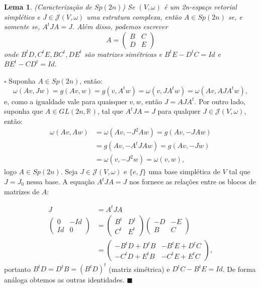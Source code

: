 \documentclass[12pt]{book}
\newtheorem{lema}[teorema]{Lema}
\newenvironment{prova}[1]{$\square$ #1}{\hfill$\blacksquare$}
\newcommand{\estruturacomplexa}{J_{0}}
\newcommand{\estruturascomplexaspadrao}{\mathcal{J}(V, \omega)}
\newcommand{\generalgroup}[2]{GL(#1, #2)}
\newcommand{\generalgroupreal}[1]{\generalgroup{#1}{\real{}}}
\newcommand{\gruposimpletico}[1]{Sp(#1)}
\newcommand{\real}[1]{\mathbb{R}^{#1}}
\begin{document}
	\begin{lema}\label{lema_caracterizacao_Sp2n}
		(Caracterização de $Sp(2n)$) Se $(V, \omega)$ é um 2n-espaço vetorial simplético e $J \in \estruturascomplexaspadrao$ uma estrutura complexa, então $A\in Sp(2n)$ se, e somente se, $A^{t}JA = J$. Além disso, podemos escrever 
		$$
		A=
		\left(
		\begin{array}{cc}
		B & C
		\\
		D & E
		\end{array}
		\right)
		$$
		onde $B^{t}D, C^{t}E, BC^{t}, DE^{t} $ são matrizes simétricas e $B^{t}E - D^{t}C = Id$ e $BE^{t} - CD^{t} = Id$.
	\end{lema}
	\begin{prova}
		Suponha $A \in Sp(2n)$, então:
		$$
		\omega(Av, Jw)= g(Av,w) = g(v,A^{t}w) = \omega(v, JA^{t}w) = \omega(Av, AJA^{t}w),
		$$
		e, como a igualdade vale para quaisquer $v,w$, então $J = AJA^{t}$. Por outro lado, suponha que $A \in \generalgroupreal{2n}$, tal que $A^{t}JA=J$ para qualquer $J \in \estruturascomplexaspadrao$, então:
		$$
		\begin{aligned}
		\omega(Av, Aw) &= \omega(Av, -J^{2}Aw)=g(Av, -JAw) \\
		&= g(Av, -A^{t}JAw) = g(Av, -Jw) 
		\\
		&= \omega(v, -J^{2}w) = \omega(v, w), 
		\end{aligned}
		$$
		logo $A \in \gruposimpletico{2n}$. Seja $J \in \estruturascomplexaspadrao$ e $\{e, f\}$ uma base simplética de $V$ tal que $J = \estruturacomplexa$ nessa base. A equação $A^{t}JA=J$ nos fornece as relações entre os blocos de matrizes de $A$:
		
		$$
		\begin{aligned}
		J &= A^{t}JA
		\\
		\left(
		\begin{array}{cc}
		0 & -Id
		\\
		Id & 0
		\end{array}
		\right)
		&=
		\left(
		\begin{array}{cc}
		B^{t} & D^{t}
		\\
		C^{t} & E^{t}
		\end{array}
		\right)
		\left(
		\begin{array}{cc}
		-D & -E
		\\
		B & C
		\end{array}
		\right)
		\\
		&=
		\left(
		\begin{array}{cc}
		-B^{t}D +D^{t}B & -B^{t}E+D^{t}C
		\\
		-C^{t}D+E^{t}B & -C^{t}E+E^{t}C
		\end{array}
		\right),
		\end{aligned}
		$$
		portanto $B^{t}D = D^{t}B = (B^{t}D)^{t}$ (matriz simétrica) e $D^{t}C-B^{t}E = Id$. De forma análoga obtemos as outras identidades.
	\end{prova}
	
\end{document}
